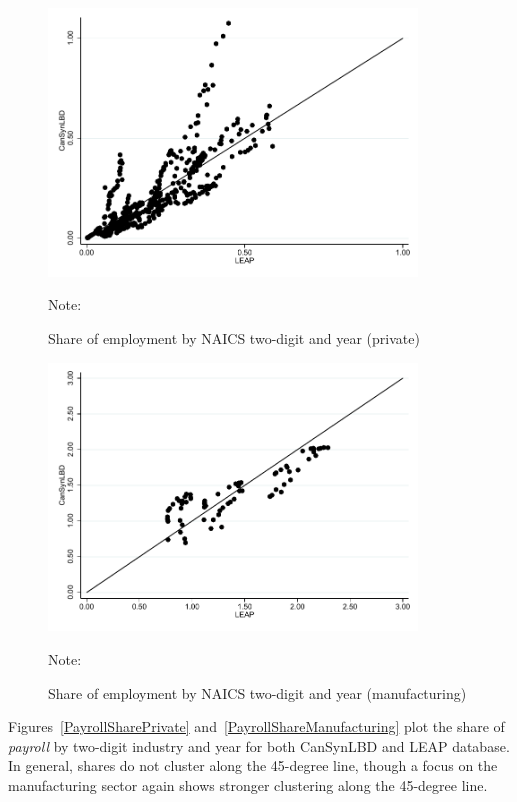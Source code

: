\begin{figure} [H]
\centering
\caption{Share of employment by NAICS two-digit and year (private)} \label{EmploymentSharePrivate}
\includegraphics[height=2.8in, width=.7\linewidth]{graphs/Share_of_employment_by_NAICS_two-digit_and_year_private_bw.pdf} 
\begin{minipage}{0.85\textwidth}
{\footnotesize Note: \TableNote \par}
\end{minipage}
\end{figure}
\vspace{-15.5pt}
\begin{figure} [H]
\centering
\caption{Share of employment by NAICS two-digit and year (manufacturing)} \label{EmploymentShareManufacturing}
\includegraphics[height=2.8in, width=.7\linewidth]{graphs/Share_of_employment_by_NAICS_two-digit_and_year_Manufacturing_bw.pdf} 
\begin{minipage}{0.85\textwidth}
{\footnotesize Note: \TableNote \par}
\end{minipage}
\end{figure}

Figures~\ref{PayrollSharePrivate} and~\ref{PayrollShareManufacturing} plot the share of \textit{payroll} by two-digit industry and year for both CanSynLBD and LEAP database. In general, shares do not cluster along the 45-degree line, though a focus on  the manufacturing sector again shows stronger clustering along the 45-degree line.

